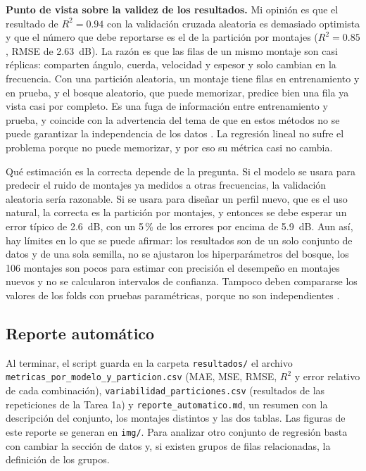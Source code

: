 \documentclass[11pt,letterpaper]{article}
\begin{document}
\textbf{Punto de vista sobre la validez de los resultados.} Mi opinión es que el resultado de $R^2 = 0.94$ con la validación cruzada aleatoria es demasiado optimista y que el número que debe reportarse es el de la partición por montajes ($R^2 = 0.85$, RMSE de 2.63~dB). La razón es que las filas de un mismo montaje son casi réplicas: comparten ángulo, cuerda, velocidad y espesor y solo cambian en la frecuencia. Con una partición aleatoria, un montaje tiene filas en entrenamiento y en prueba, y el bosque aleatorio, que puede memorizar, predice bien una fila ya vista casi por completo. Es una fuga de información entre entrenamiento y prueba, y coincide con la advertencia del tema de que en estos métodos no se puede garantizar la independencia de los datos \parencite{tecnm2026_tema33}. La regresión lineal no sufre el problema porque no puede memorizar, y por eso su métrica casi no cambia.

Qué estimación es la correcta depende de la pregunta. Si el modelo se usara para predecir el ruido de montajes ya medidos a otras frecuencias, la validación aleatoria sería razonable. Si se usara para diseñar un perfil nuevo, que es el uso natural, la correcta es la partición por montajes, y entonces se debe esperar un error típico de 2.6~dB, con un 5\,\% de los errores por encima de 5.9~dB. Aun así, hay límites en lo que se puede afirmar: los resultados son de un solo conjunto de datos y de una sola semilla, no se ajustaron los hiperparámetros del bosque, los 106 montajes son pocos para estimar con precisión el desempeño en montajes nuevos y no se calcularon intervalos de confianza. Tampoco deben compararse los valores de los folds con pruebas paramétricas, porque no son independientes \parencite{tecnm2026_tema33}.

\subsection{Reporte automático}

Al terminar, el script guarda en la carpeta \texttt{resultados/} el archivo \texttt{metricas\_por\_modelo\_y\_particion.csv} (MAE, MSE, RMSE, $R^2$ y error relativo de cada combinación), \texttt{variabilidad\_particiones.csv} (resultados de las repeticiones de la Tarea 1a) y \texttt{reporte\_automatico.md}, un resumen con la descripción del conjunto, los montajes distintos y las dos tablas. Las figuras de este reporte se generan en \texttt{img/}. Para analizar otro conjunto de regresión basta con cambiar la sección de datos y, si existen grupos de filas relacionadas, la definición de los grupos.
\end{document}
